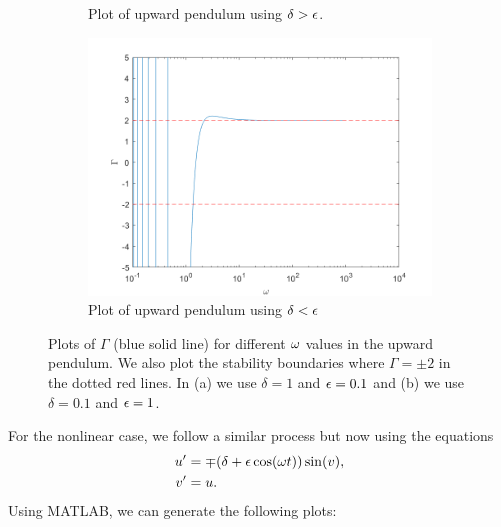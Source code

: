 \documentclass[12pt]{report}
\begin{document}
\begin{solution}
\begin{enumerate}
\begin{figure}[H]
\begin{subfigure}[b]{0.5\linewidth}
                \caption{Plot of upward pendulum using $\delta > {\epsilon}$.}
                \label{fig2:a}
                \vspace{4ex}
            \end{subfigure}%
            \begin{subfigure}[b]{0.5\linewidth}
                \centering
                \includegraphics[width=\linewidth]{images/u2.png}
                \caption{Plot of upward pendulum using $\delta < {\epsilon}$}
                \label{fig2:b}
                \vspace{4ex}
            \end{subfigure}
            \caption{Plots of $\Gamma$ (blue solid line) for different ${\omega}$ values in the upward pendulum. We also plot the stability boundaries where $\Gamma = \pm 2$ in the dotted red lines. In (a) we use $\delta = 1$ and ${\epsilon} = 0.1$ and (b) we use $\delta = 0.1$ and ${\epsilon} = 1$. }
            \label{fig2}
        \end{figure}
        \noindent
        For the nonlinear case, we follow a similar process but now using the equations
        \begin{align*}
            u' &= \mp {\left(\delta + {\epsilon}\cos({\omega}t)\right)}\sin(v),\\
            v' &= u.
        \end{align*}    
        Using MATLAB, we can generate the following plots:
        \begin{figure}[H]
            \begin{subfigure}[b]{0.5\linewidth}
                \centering

\end{subfigure}
\end{figure}
\end{enumerate}
\end{solution}
\end{document}
